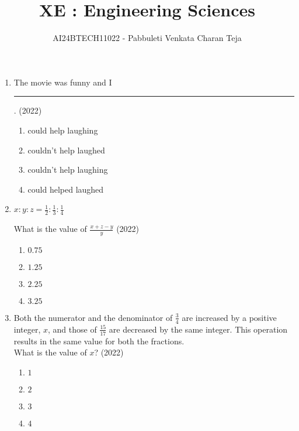 \documentclass[journal]{IEEEtran}
\begin{document}

\vspace{3cm}

\title{XE : Engineering Sciences}
\author{AI24BTECH11022 - Pabbuleti Venkata Charan Teja}
\maketitle

\renewcommand{\thefigure}{\theenumi}
\renewcommand{\thetable}{\theenumi}


\begin{enumerate}
\item The movie was funny and I \rule{1cm}{0.15mm}. \hfill(2022)
\begin{multicols}{2}
\begin{enumerate}
\item could help laughing
\item couldn't help laughed
\item couldn't help laughing
\item could helped laughed
\end{enumerate}
\end{multicols}


\item $x:y:z=\frac{1}{2}:\frac{1}{3}:\frac{1}{4}$

What is the value of $\frac{x+z-y}{y}$ \hfill(2022)
\begin{multicols}{2}
\begin{enumerate}
\item $0.75$
\item $1.25$
\item $2.25$
\item $3.25$
\end{enumerate}
\end{multicols}


\item Both the numerator and the denominator of $\frac{3}{4}$ are increased by a positive
integer, $x$, and those of $\frac{15}{17}$ are decreased by the same integer. This operation
results in the same value for both the fractions.\\

What is the value of $x$? \hfill(2022)
\begin{multicols}{2}
\begin{enumerate}
\item $1$
\item $2$
\item $3$
\item $4$
\end{enumerate}
\end{multicols}



\end{enumerate}
\end{document}
